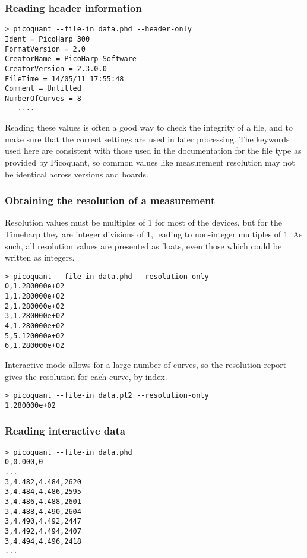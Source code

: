 \documentclass{article}
\begin{document}
\subsubsection{Reading header information}
\begin{verbatim}
> picoquant --file-in data.phd --header-only
Ident = PicoHarp 300
FormatVersion = 2.0
CreatorName = PicoHarp Software
CreatorVersion = 2.3.0.0
FileTime = 14/05/11 17:55:48
Comment = Untitled
NumberOfCurves = 8
   ....
\end{verbatim}

Reading these values is often a good way to check the integrity of a file, and to make sure that the correct settings are used in later processing. The keywords used here are consistent with those used in the documentation for the file type as provided by Picoquant, so common values like measurement resolution may not be identical across versions and boards. 

\subsubsection{Obtaining the resolution of a measurement}
Resolution values must be multiples of 1\pico\second{} for most of the devices, but for the Timeharp they are integer divisions of 1\nano\second, leading to non-integer multiples of 1\pico\second. As such, all resolution values are presented as floats, even those which could be written as integers.
\begin{verbatim}
> picoquant --file-in data.phd --resolution-only
0,1.280000e+02
1,1.280000e+02
2,1.280000e+02
3,1.280000e+02
4,1.280000e+02
5,5.120000e+02
6,1.280000e+02
\end{verbatim}
Interactive mode allows for a large number of curves, so the resolution report gives the resolution for each curve, by index.
\begin{verbatim}
> picoquant --file-in data.pt2 --resolution-only
1.280000e+02
\end{verbatim}

\subsubsection{Reading interactive data}
\begin{verbatim}
> picoquant --file-in data.phd
0,0.000,0
...
3,4.482,4.484,2620
3,4.484,4.486,2595
3,4.486,4.488,2601
3,4.488,4.490,2604
3,4.490,4.492,2447
3,4.492,4.494,2407
3,4.494,4.496,2418
...
\end{verbatim}
\end{document}
